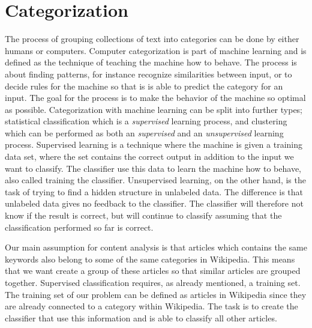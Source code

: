 \section{Categorization}
The process of grouping collections of text into categories can be done by either humans or computers. Computer categorization is part of machine learning and is defined as the technique of teaching the machine how to behave. The process is about finding patterns, for instance recognize similarities between input, or to decide rules for the machine so that is is able to predict the category for an input. The goal for the process is to make the behavior of the machine so optimal as possible. Categorization with machine learning can be split into further types; statistical classification which is a \textit{supervised} learning process, and clustering which can be performed as both an \textit{supervised} and an \textit{unsupervised} learning process. Supervised learning is a technique where the machine is given a training data set, where the set contains the correct output in addition to the input we want to classify. The classifier use this data to learn the machine how to behave, also called training the classifier. Unsupervised learning, on the other hand, is the task of trying to find a hidden structure in unlabeled data. The difference is that unlabeled data gives no feedback to the classifier. 
The classifier will therefore not know if the result is correct, but will continue to classify assuming that the classification performed so far is correct.  

Our main assumption for content analysis is that articles which contains the same keywords also belong to some of the same categories in Wikipedia. This means that we want create a group of these articles so that similar articles are grouped together. Supervised classification requires, as already mentioned, a training set. The training set of our problem can be defined as articles in Wikipedia since they are already connected to a category within Wikipedia. The task is to create the classifier that use  this information and is able to classify all other articles. 


